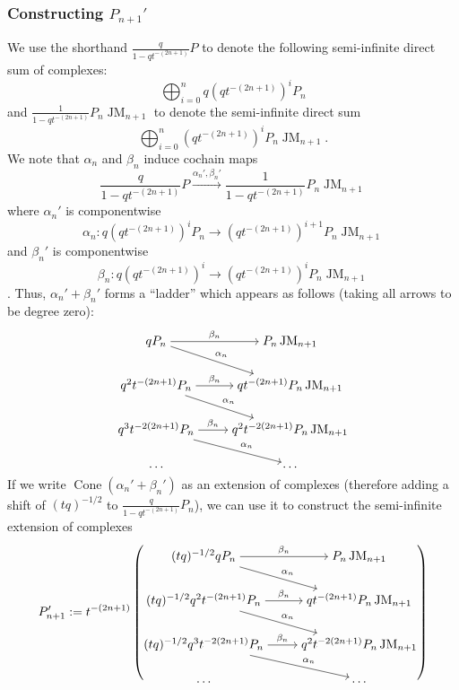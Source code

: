 \documentclass[11pt]{article}
\DeclareMathOperator{\Cone}{Cone}
\DeclareMathOperator{\JM}{JM}
\theoremstyle{definition}
\theoremstyle{remark}
\numberwithin{equation}{section}
\begin{document}
\subsubsection{Constructing $P_{n+1}'$}
\label{ssec:constructpnplusone}
We use the shorthand $\frac{q}{1-qt^{-(2n+1)}}P$ to denote the following
semi-infinite direct sum of complexes:
\[\bigoplus_{i=0}^n q(qt^{-(2n+1)})^i P_n
\]
and $\frac{1}{1-qt^{-(2n+1)}}P_n\JM_{n+1}$ to denote the semi-infinite direct
sum
\[\bigoplus_{i=0}^n (qt^{-(2n+1)})^i P_n\JM_{n+1}.
\]
We note that $\alpha_n$ and $\beta_n$ induce cochain maps
\[\frac{q}{1-qt^{-(2n+1)}}P\xrightarrow{\alpha_n',\beta_n'}
\frac{1}{1-qt^{-(2n+1)}}P_n\JM_{n+1}\]
where $\alpha_n'$ is componentwise
\[\alpha_n:q(qt^{-(2n+1)})^i P_n\to
(qt^{-(2n+1)})^{i+1}P_n\JM_{n+1}\]
and
$\beta_n'$ is componentwise
\[\beta_n:q(qt^{-(2n+1)})^i\to (qt^{-(2n+1)})^iP_n\JM_{n+1}\].
Thus, $\alpha_n'+\beta_n'$ forms a ``ladder'' which appears as follows
(taking all arrows to be degree zero):
\[\begin{tikzcd}[ampersand replacement=\&,cramped]
	{qP_{n}} \& {P_{n}\JM_{n+1}} \\
	{q^2t^{-(2n+1)}P_{n}} \& {qt^{-(2n+1)}P_{n}\JM_{n+1}} \\
	{q^3t^{-2(2n+1)}P_{n}} \& {q^2t^{-2(2n+1)}P_{n}\JM_{n+1}} \\
	\dots \& \dots
	\arrow["{\beta_n}", from=1-1, to=1-2]
	\arrow["{\alpha_n}", from=1-1, to=2-2]
	\arrow["{\beta_n}", from=2-1, to=2-2]
	\arrow["{\alpha_n}", from=2-1, to=3-2]
	\arrow["{\beta_n}", from=3-1, to=3-2]
	\arrow["{\alpha_n}", from=3-1, to=4-2]
\end{tikzcd}\]
If we write $\Cone(\alpha_n'+\beta_n')$ as an extension of complexes (therefore
adding a shift of $(tq)^{-1/2}$ to $\frac{q}{1-qt^{-(2n+1)}}P_n$), we can
use it to
construct the semi-infinite
extension of complexes
\[
	P_{n+1}':=t^{-(2n+1)}\left(
\begin{tikzcd}[ampersand replacement=\&,cramped]
	{(tq)^{-1/2}qP_{n}} \& {P_{n}\JM_{n+1}} \\
	{(tq)^{-1/2}q^2t^{-(2n+1)}P_{n}} \& {qt^{-(2n+1)}P_{n}\JM_{n+1}} \\
	{(tq)^{-1/2}q^3t^{-2(2n+1)}P_{n}} \& {q^2t^{-2(2n+1)}P_{n}\JM_{n+1}} \\
	\dots \& \dots
	\arrow["{\beta_n}", from=1-1, to=1-2]
	\arrow["{\alpha_n}", from=1-1, to=2-2]
	\arrow["{\beta_n}", from=2-1, to=2-2]
	\arrow["{\alpha_n}", from=2-1, to=3-2]
	\arrow["{\beta_n}", from=3-1, to=3-2]
	\arrow["{\alpha_n}", from=3-1, to=4-2]
\end{tikzcd}\right)
\]
\end{document}

